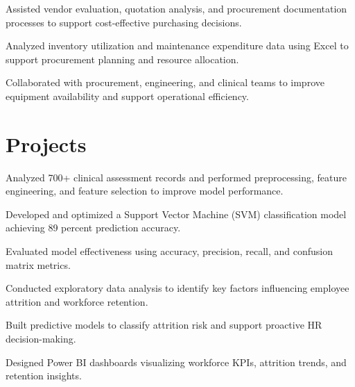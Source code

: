 \documentclass[]{deedy-resume-reversed}
\begin{document}
\begin{minipage}[t]{0.65\textwidth}
\begin{tightemize}
\item Assisted vendor evaluation, quotation analysis, and procurement documentation processes to support cost-effective purchasing decisions.
\item Analyzed inventory utilization and maintenance expenditure data using Excel to support procurement planning and resource allocation.
\item Collaborated with procurement, engineering, and clinical teams to improve equipment availability and support operational efficiency.

\end{tightemize}

\sectionsep


\section{Projects}


\begin{tightemize}
\item Analyzed 700+ clinical assessment records and performed preprocessing, feature engineering, and feature selection to improve model performance.
\item Developed and optimized a Support Vector Machine (SVM) classification model achieving 89 percent prediction accuracy.
\item Evaluated model effectiveness using accuracy, precision, recall, and confusion matrix metrics.

\end{tightemize}

\sectionsep


\begin{tightemize}
\item Conducted exploratory data analysis to identify key factors influencing employee attrition and workforce retention.
\item Built predictive models to classify attrition risk and support proactive HR decision-making.
\item Designed Power BI dashboards visualizing workforce KPIs, attrition trends, and retention insights.
\end{tightemize}


\end{minipage}
\end{document}
